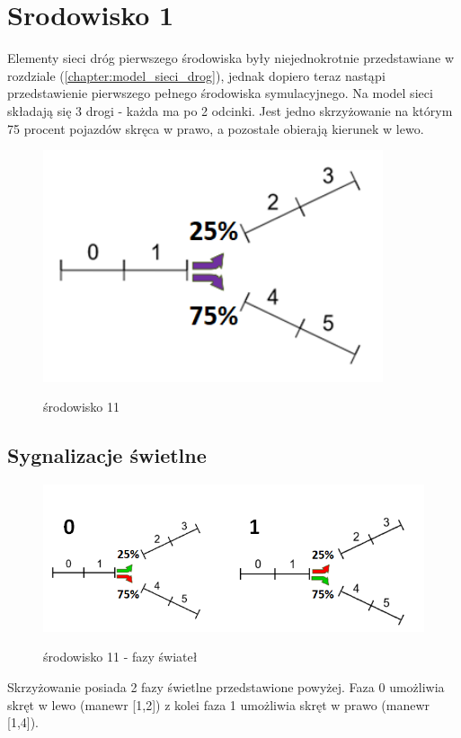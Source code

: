 \documentclass[12pt]{book}
\theoremstyle{plain}
\newcommand{\myref}[1]{(\ref{#1})}
\begin{document}
\section{Srodowisko 1}
Elementy sieci dróg pierwszego środowiska były niejednokrotnie przedstawiane w rozdziale \myref{chapter:model_sieci_drog}, jednak dopiero teraz nastąpi przedstawienie pierwszego pełnego środowiska symulacyjnego. Na model sieci składają się 3 drogi - każda ma po 2 odcinki. Jest jedno skrzyżowanie na którym 75 procent pojazdów skręca w prawo, a pozostałe obierają kierunek w lewo.
\begin{figure}[H]
	\centering
	\includegraphics[width=10cm]{images/env_11_procenty}
	\label{fig:env_11}
	\caption{środowisko 11}
\end{figure}

\subsection{Sygnalizacje świetlne}	
\begin{figure}[H]
	\centering
	\includegraphics[width=17cm]{images/env_11_fazy_procenty_no_yellow}
	\label{fig:env_11_fazy}
	\caption{środowisko 11 - fazy świateł}
\end{figure}\noindent
Skrzyżowanie posiada 2 fazy świetlne przedstawione powyżej. Faza 0 umożliwia skręt w lewo (manewr [1,2]) z kolei faza 1 umożliwia skręt w prawo (manewr [1,4]).
\end{document}
